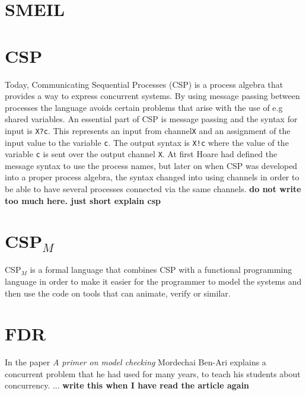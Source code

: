 \documentclass[a4paper]{report}
\newcommand{\cspm}{CSP$_M$ }
\begin{document}
\section{SMEIL}
\section{CSP}
Today, Communicating Sequential Processes (CSP) is a process algebra that provides a way to express concurrent systems. By using message passing between processes the language avoids certain problems that arise with the use of e.g shared variables. An essential part of CSP is message passing and the syntax for input is \texttt{X?c}. This represents an input from channel\texttt{X} and an assignment of the input value to the variable \texttt{c}. The output syntax is \texttt{X!c} where the value of the variable \texttt{c} is sent over the output channel \texttt{X}. At first Hoare had defined the message syntax to use the process names, but later on when CSP was developed into a proper process algebra, the syntax changed into using channels in order to be able to have several processes connected via the same channels.   \textbf{do not write too much here. just short explain csp}
\section{\cspm}
\cspm is a formal language that combines CSP with a functional programming language in order to make it easier for the programmer to model the systems and then use the code on tools that can animate, verify or similar.  
\section{FDR}
In the paper \textit{A primer on model checking}\cite{Ben-ari2010} Mordechai Ben-Ari explains a concurrent problem that he had used for many years, to teach his students about concurrency. ... \textbf{write this when I have read the article again}
\end{document}
